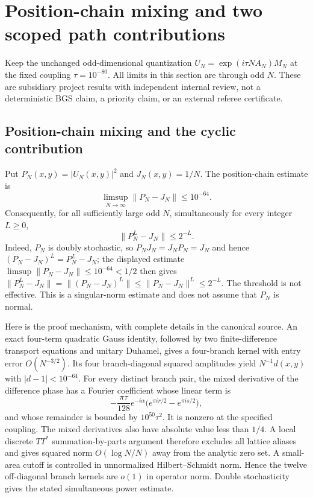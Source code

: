 \section{Position-chain mixing and two scoped path contributions}
\label{sec:actual-path-theorems}
Keep the unchanged odd-dimensional quantization
$U_N=\exp(i\tau N A_N)M_N$ at the fixed coupling $\tau=10^{-80}$.
All limits in this section are through odd $N$. These are subsidiary
project results with independent internal review, not a deterministic BGS
claim, a priority claim, or an external referee certificate.

\subsection{Position-chain mixing and the cyclic contribution}
Put $P_N(x,y)=|U_N(x,y)|^2$ and $J_N(x,y)=1/N$. The position-chain
estimate is
\[
 \limsup_{N\to\infty}\|P_N-J_N\|\le10^{-64}.
\]
Consequently, for all sufficiently large odd $N$, simultaneously for every
integer $L\ge0$,
\[
 \|P_N^L-J_N\|\le2^{-L}.
\]
Indeed, $P_N$ is doubly stochastic, so $P_NJ_N=J_NP_N=J_N$ and hence
$(P_N-J_N)^L=P_N^L-J_N$; the displayed estimate
$\limsup\|P_N-J_N\|\le10^{-64}<1/2$ then gives
$\|P_N^L-J_N\|=\|(P_N-J_N)^L\|\le\|P_N-J_N\|^L\le2^{-L}$.
The threshold is not effective. This is a singular-norm estimate and does
not assume that $P_N$ is normal.

Here is the proof mechanism, with complete details in the canonical source.
An exact four-term quadratic Gauss identity, followed by two finite-difference
transport equations and unitary Duhamel, gives a four-branch kernel with
entry error $O(N^{-3/2})$. Its four branch-diagonal squared amplitudes yield
$N^{-1}d(x,y)$ with $|d-1|<10^{-64}$. For every distinct branch pair, the
mixed derivative of the difference phase has a Fourier coefficient whose
linear term is
\[
 -\frac{\pi\tau}{128}e^{-i\alpha}
   \bigl(e^{\pi i r/2}-e^{\pi i s/2}\bigr),
\]
and whose remainder is bounded by $10^{50}\tau^2$. It is nonzero at the
specified coupling. The mixed derivatives also have absolute value less
than $1/4$. A local discrete $TT^*$ summation-by-parts argument therefore
excludes all lattice aliases and gives squared norm $O(\log N/N)$ away
from the analytic zero set. A small-area cutoff is controlled in
unnormalized Hilbert--Schmidt norm. Hence the twelve off-diagonal branch
kernels are $o(1)$ in operator norm. Double stochasticity gives the stated
simultaneous power estimate.

